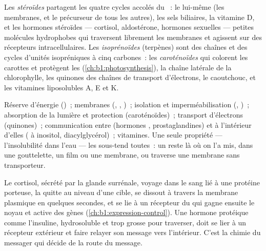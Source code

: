 \begin{definition}\label{def:b1:lipids:steroids}
Les \emph{stéroïdes} partagent les quatre cycles
accolés du ~: le  lui-même (les membranes, et le
précurseur de tous les autres), les sels biliaires, la vitamine D, et
les hormones stéroïdes --- cortisol, aldostérone, hormones sexuelles ---
petites molécules hydrophobes qui traversent librement les membranes et
agissent sur des récepteurs intracellulaires. Les
\emph{isoprénoïdes} (terpènes) sont des chaînes et
des cycles d'unités isopréniques à cinq carbones~: les
\emph{caroténoïdes} qui colorent les carottes et protègent les
 (\cref{ch:b1:photosynthesis}), la chaîne latérale de la
chlorophylle, les quinones des chaînes de transport d'électrons, le
caoutchouc, et les vitamines liposolubles A, E et K.
\end{definition}

\begin{proposition}\label{prop:b1:lipids:functions}
Réserve d'énergie ()~; membranes (,
, )~; isolation et imperméabilisation (,
)~; absorption de la lumière et protection (caroténoïdes)~;
transport d'électrons (quinones)~; communication entre 
(hormones , prostaglandines) et à l'intérieur d'elles
( à inositol, diacylglycérol)~; vitamines. Une seule
propriété --- l'insolubilité dans l'eau --- les sous-tend toutes~: un
 reste là où on l'a mis, dans une gouttelette, un film ou une
membrane, ou traverse une membrane sans transporteur.
\end{proposition}

\begin{example}\label{ex:b1:lipids:steroidhormone}
Le cortisol, sécrété par la glande surrénale, voyage dans le sang lié à
une protéine porteuse, la quitte au niveau d'une  cible, se
dissout à travers la membrane plasmique en quelques secondes, et se lie
à un récepteur du  qui gagne ensuite le noyau et active des gènes
(\cref{ch:b1:expression-control}). Une hormone protéique comme
l'insuline, hydrosoluble et trop grosse pour traverser, doit se lier à
un récepteur extérieur et faire relayer son message vers l'intérieur.
C'est la chimie du messager qui décide de la route du message.
\end{example}

